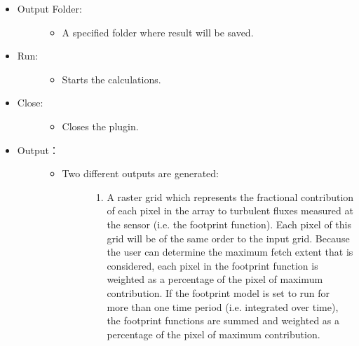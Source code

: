 \documentclass[letterpaper,10pt,english]{sphinxmanual}
\begin{document}
\begin{itemize}
\begin{description}
\begin{itemize}
\end{itemize}

\end{description}

\item {} \begin{description}
\item[{Output Folder:}] \leavevmode\begin{itemize}
\item {} 
A specified folder where result will be saved.

\end{itemize}

\end{description}

\item {} \begin{description}
\item[{Run:}] \leavevmode\begin{itemize}
\item {} 
Starts the calculations.

\end{itemize}

\end{description}

\item {} \begin{description}
\item[{Close:}] \leavevmode\begin{itemize}
\item {} 
Closes the plugin.

\end{itemize}

\end{description}

\item {} \begin{description}
\item[{Output：}] \leavevmode\begin{itemize}
\item {} \begin{description}
\item[{Two different outputs are generated:}] \leavevmode\begin{enumerate}
\item {} 
A raster grid which represents the fractional contribution of each
pixel in the array to turbulent fluxes measured at the sensor (i.e.
the footprint function). Each pixel of this grid will be of the same
order to the input grid. Because the user can determine the maximum
fetch extent that is considered, each pixel in the footprint function
is weighted as a percentage of the pixel of maximum contribution. If
the footprint model is set to run for more than one time period (i.e.
integrated over time), the footprint functions are summed and
weighted as a percentage of the pixel of maximum contribution.


\end{enumerate}
\end{description}
\end{itemize}
\end{description}
\end{itemize}
\end{document}

